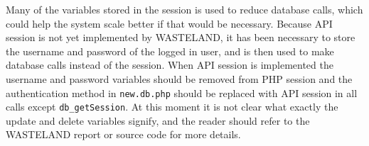 Many of the variables stored in the session is used to reduce database calls, which could help the system scale better if that would be necessary. Because API session is not yet implemented by WASTELAND, it has been necessary to store the username and password of the logged in user, and is then used to make database calls instead of the session. When API session is implemented the username and password variables should be removed from PHP session and the authentication method in \texttt{new.db.php} should be replaced with API session in all calls except \texttt{db\_getSession}. At this moment it is not clear what exactly the update and delete variables signify, and the reader should refer to the WASTELAND report or source code for more details.